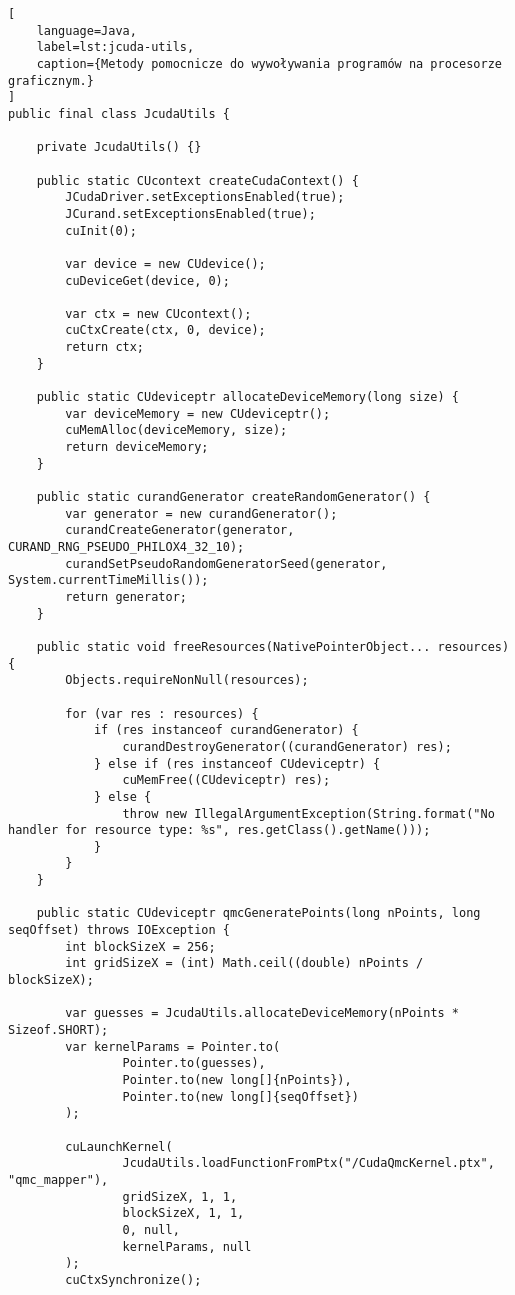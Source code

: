 \begin{lstlisting}[
    language=Java,
    label=lst:jcuda-utils,
    caption={Metody pomocnicze do wywoływania programów na procesorze graficznym.}
]
public final class JcudaUtils {

    private JcudaUtils() {}

    public static CUcontext createCudaContext() {
        JCudaDriver.setExceptionsEnabled(true);
        JCurand.setExceptionsEnabled(true);
        cuInit(0);

        var device = new CUdevice();
        cuDeviceGet(device, 0);

        var ctx = new CUcontext();
        cuCtxCreate(ctx, 0, device);
        return ctx;
    }

    public static CUdeviceptr allocateDeviceMemory(long size) {
        var deviceMemory = new CUdeviceptr();
        cuMemAlloc(deviceMemory, size);
        return deviceMemory;
    }

    public static curandGenerator createRandomGenerator() {
        var generator = new curandGenerator();
        curandCreateGenerator(generator, CURAND_RNG_PSEUDO_PHILOX4_32_10);
        curandSetPseudoRandomGeneratorSeed(generator, System.currentTimeMillis());
        return generator;
    }

    public static void freeResources(NativePointerObject... resources) {
        Objects.requireNonNull(resources);

        for (var res : resources) {
            if (res instanceof curandGenerator) {
                curandDestroyGenerator((curandGenerator) res);
            } else if (res instanceof CUdeviceptr) {
                cuMemFree((CUdeviceptr) res);
            } else {
                throw new IllegalArgumentException(String.format("No handler for resource type: %s", res.getClass().getName()));
            }
        }
    }

    public static CUdeviceptr qmcGeneratePoints(long nPoints, long seqOffset) throws IOException {
        int blockSizeX = 256;
        int gridSizeX = (int) Math.ceil((double) nPoints / blockSizeX);

        var guesses = JcudaUtils.allocateDeviceMemory(nPoints * Sizeof.SHORT);
        var kernelParams = Pointer.to(
                Pointer.to(guesses),
                Pointer.to(new long[]{nPoints}),
                Pointer.to(new long[]{seqOffset})
        );

        cuLaunchKernel(
                JcudaUtils.loadFunctionFromPtx("/CudaQmcKernel.ptx", "qmc_mapper"),
                gridSizeX, 1, 1,
                blockSizeX, 1, 1,
                0, null,
                kernelParams, null
        );
        cuCtxSynchronize();


\end{lstlisting}
